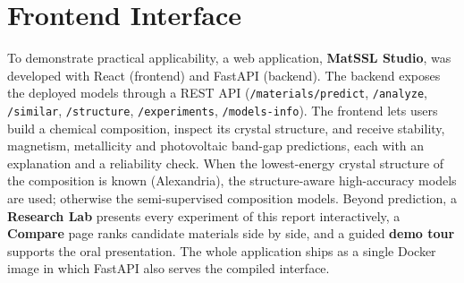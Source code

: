 \clearpage
\section{Frontend Interface}

To demonstrate practical applicability, a web application, \textbf{MatSSL Studio}, was developed
with React (frontend) and FastAPI (backend). The backend exposes the deployed models through a REST
API (\texttt{/materials/predict}, \texttt{/analyze}, \texttt{/similar}, \texttt{/structure},
\texttt{/experiments}, \texttt{/models-info}). The frontend lets users build a chemical
composition, inspect its crystal structure, and receive stability, magnetism, metallicity and
photovoltaic band-gap predictions, each with an explanation and a reliability check. When the lowest-energy crystal structure of the composition is known (Alexandria),
the structure-aware high-accuracy models are used; otherwise the semi-supervised composition
models. Beyond
prediction, a \textbf{Research Lab} presents every experiment of this report interactively, a
\textbf{Compare} page ranks candidate materials side by side, and a guided \textbf{demo tour}
supports the oral presentation. The whole application ships as a single Docker image in which
FastAPI also serves the compiled interface.

